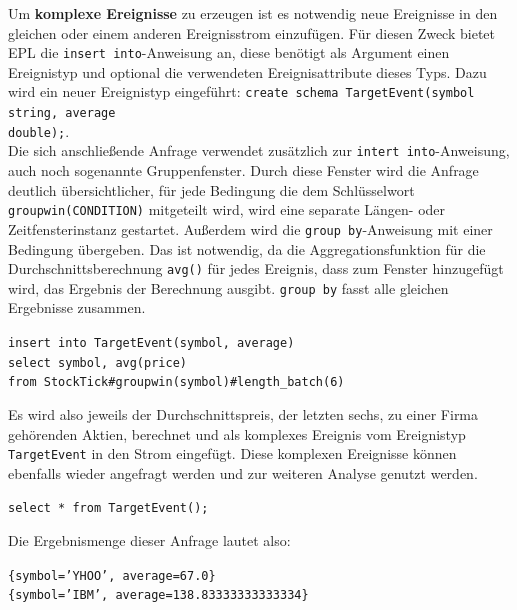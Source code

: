 \documentclass{acm_proc_article-sp}
\begin{document}
Um \textbf{komplexe Ereignisse} zu erzeugen ist es notwendig neue Ereignisse in den 
gleichen oder einem anderen Ereignisstrom einzufügen. Für diesen Zweck bietet EPL die 
\texttt{insert into}-Anweisung an, diese benötigt als Argument einen Ereignistyp und 
optional die verwendeten Ereignisattribute dieses Typs. Dazu wird ein neuer Ereignistyp 
eingeführt: \texttt{create schema TargetEvent(symbol string, average\\ double);}.\\
Die sich anschließende Anfrage verwendet zusätzlich zur \texttt{intert into}-Anweisung, 
auch noch sogenannte Gruppenfenster. Durch diese Fenster wird die Anfrage deutlich 
übersichtlicher, für jede Bedingung die dem Schlüsselwort \texttt{groupwin(CONDITION)} 
mitgeteilt wird, wird eine separate Längen- oder Zeitfensterinstanz gestartet. Außerdem 
wird die \texttt{group by}-Anweisung mit einer Bedingung übergeben. Das ist notwendig, da 
die Aggregationsfunktion für die Durchschnittsberechnung \texttt{avg()} für jedes 
Ereignis, dass zum Fenster hinzugefügt wird, das Ergebnis der Berechnung ausgibt. 
\texttt{group by} fasst alle gleichen Ergebnisse zusammen.

\texttt{insert into TargetEvent(symbol, average)\\
select symbol, avg(price)\\
from StockTick\#groupwin(symbol)\#length\_batch(6)}

Es wird also jeweils der Durchschnittspreis, der letzten sechs, zu einer Firma gehörenden 
Aktien, berechnet und als komplexes Ereignis vom Ereignistyp \texttt{TargetEvent} in den 
Strom eingefügt. Diese komplexen Ereignisse können ebenfalls wieder angefragt werden und 
zur weiteren Analyse genutzt werden.

\texttt{select  * from TargetEvent();} 

Die Ergebnismenge dieser Anfrage lautet also:

\texttt{\{symbol='YHOO', average=67.0\}}\\
\texttt{\{symbol='IBM', average=138.83333333333334\}}
\end{document}
